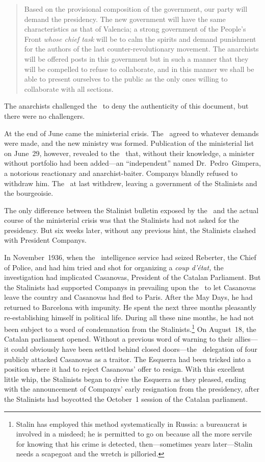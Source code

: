 \begin{quotation}
  Based on the provisional composition of the government, our party will demand the presidency. The new government will have the same characteristics as that of Valencia; a strong government of the People’s Front \emph{whose chief task} will be to calm the spirits and demand punishment for the authors of the last counter-revolutionary movement. The anarchists will be offered posts in this government but in such a manner that they will be compelled to refuse to collaborate, and in this manner we shall be able to present ourselves to the public as the only ones willing to collaborate with all sections.
\end{quotation}

The anarchists challenged the \PSUC\ to deny the authenticity of this document, but there were no challengers.

At the end of June came the ministerial crisis. The \CNT\ agreed to whatever demands were made, and the new ministry was formed. Publication of the ministerial list on June~29, however, revealed to the \CNT\ that, without their knowledge, a minister without portfolio had been added---an ``independent'' named Dr.~Pedro~Gimpera, a notorious reactionary and anarchist-baiter. Companys blandly refused to withdraw him. The \CNT\ at last withdrew, leaving a government of the Stalinists and the bourgeoisie. {\indexCNT}

The only difference between the Stalinist bulletin exposed by the \FAI\ and the actual course of the ministerial crisis was that the Stalinists had not asked for the presidency. But six weeks later, without any previous hint, the Stalinists clashed with President Companys.

In November~1936, when the \CNT\ intelligence service had seized Reberter, the Chief of Police, and had him tried and shot for organizing a \emph{coup d’\'etat,} the investigation had implicated Casanovas, President of the Catalan Parliament. But the Stalinists had supported Companys in prevailing upon the \CNT\ to let Casanovas leave the country and Casanovas had fled to Paris. After the May Days, he had returned to Barcelona with impunity. He spent the next three months pleasantly re-establishing himself in political life. During all these nine months, he had not been subject to a word of condemnation from the Stalinists.\footnote{Stalin has employed this method systematically in Russia: a bureaucrat is involved in a misdeed; he is permitted to go on because all the more servile for knowing that his crime is detected, then---sometimes years later---Stalin needs a scapegoat and the wretch is pilloried.} On August~18, the Catalan parliament opened. Without a previous word of warning to their allies---it could obviously have been settled behind closed doors---the \PSUC\ delegation of four publicly attacked Casanovas as a traitor. The Esquerra had been tricked into a position where it had to reject Casanovas’ offer to resign. With this excellent little whip, the Stalinists began to drive the Esquerra as they pleased, ending with the announcement of Companys’ early resignation from the presidency, after the Stalinists had boycotted the October~1 session of the Catalan parliament.

